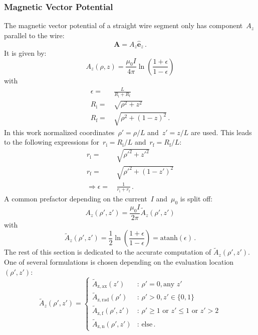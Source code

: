 \subsubsection{Magnetic Vector Potential}
The magnetic vector potential of a straight wire segment
only has component~$A_z$ parallel to the wire:
\begin{equation}
 \mathbf{A} = A_z \hat{\mathbf{e}}_z \, .
\end{equation}
It is given by:
\begin{equation}
  A_z(\rho, z) = \frac{\mu_0 I}{4 \pi} \ln \left( \frac{1 + \epsilon}{1 - \epsilon} \right)
\end{equation}
with
\begin{align}
  \epsilon =&\, \frac{L}{R_\mathrm{i} + R_\mathrm{f}} \\
       R_\mathrm{i} =&\, \sqrt{\rho^2 + z^2} \\
       R_\mathrm{f} =&\, \sqrt{\rho^2 + (1 - z)^2} \, .
\end{align}
In this work normalized coordinates~$\rho' = \rho/L$ and~$z' = z/L$ are used.
This leads to the following expressions
for~$r_\mathrm{i} = R_\mathrm{i}/L$ and~$r_\mathrm{f} = R_\mathrm{f}/L$:
\begin{align}
  r_\mathrm{i} =&\, \sqrt{{\rho'}^2 +      {z'}^2 }       \label{eqn:r_i_default} \\
  r_\mathrm{f} =&\, \sqrt{{\rho'}^2 + (1 - {z'})^2}       \label{eqn:r_f_default} \\
  \Rightarrow
  \epsilon     =&\, \frac{1}{r_\mathrm{i} + r_\mathrm{f}} \label{eqn:eps_default}\, .
\end{align}
A common prefactor depending on the current~$I$ and~$\mu_0$ is split off:
\begin{equation}
  A_z(\rho', z') = \frac{\mu_0 I}{2 \pi} \tilde{A}_z (\rho', z')
\end{equation}
with
\begin{equation}
  \tilde{A}_z (\rho', z')
  = \frac{1}{2} \ln \left( \frac{1 + \epsilon}{1 - \epsilon} \right)
  = \textrm{atanh} (\epsilon) \, . \label{eqn:A_z_tilde}
\end{equation}
The rest of this section is dedicated to the accurate computation of $\tilde{A}_z (\rho', z')$.
One of several formulations is chosen depending on the evaluation location~$(\rho', z')$:
\begin{equation}
  \tilde{A}_z (\rho', z') =
  \begin{cases}
    \tilde{A}_\mathrm{z,ax}  (z')        &:\, \rho' = 0 , \textrm{any } z'      \\
    \tilde{A}_\mathrm{z,rad} (\rho')     &:\, \rho' > 0, z' \in \{0, 1\} \\
    \tilde{A}_\mathrm{z,f}   (\rho', z') &:\, \rho' \geq 1 \textrm{ or } z' \leq 1 \textrm{ or } z' > 2 \\
    \tilde{A}_\mathrm{z,n}   (\rho', z') &:\, \textrm{else} \, .
  \end{cases} \label{eqn:sws_A_z_switchover}
\end{equation}
